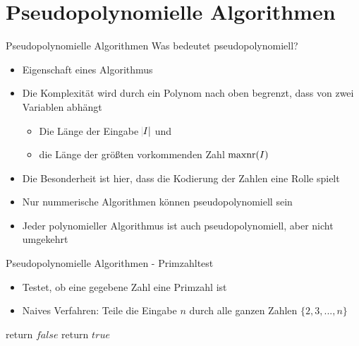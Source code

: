 \section{Pseudopolynomielle Algorithmen}

\begin{frame}{Pseudopolynomielle Algorithmen}
Was bedeutet pseudopolynomiell?

\begin{itemize}
   	\item Eigenschaft eines Algorithmus
	\item Die Komplexität wird durch ein Polynom nach oben begrenzt, dass von zwei Variablen abhängt
    \begin{itemize}
        \item Die Länge der Eingabe $\abs{I}$ und
        \item die Länge der größten vorkommenden Zahl $\operatorname{maxnr}(I)$
    \end{itemize}
    \item Die Besonderheit ist hier, dass die Kodierung der Zahlen eine Rolle spielt
    \item Nur nummerische Algorithmen können pseudopolynomiell sein
    \item Jeder polynomieller Algorithmus ist auch pseudopolynomiell, aber nicht umgekehrt
\end{itemize}
\end{frame}

\begin{frame}{Pseudopolynomielle Algorithmen - Primzahltest}
\begin{itemize}
	\item Testet, ob eine gegebene Zahl eine Primzahl ist
	\item Naives Verfahren: Teile die Eingabe $n$ durch alle ganzen Zahlen $\{2,3,...,n\}$
\end{itemize}

\begin{algorithm}[H]
\caption{Naiver Primzahltest}
    \begin{algorithmic}
                \State return $false$
            \EndIf
            \EndFor
          	\State return $true$
        \EndFunction
    \end{algorithmic}
\end{algorithm}
\end{frame}

